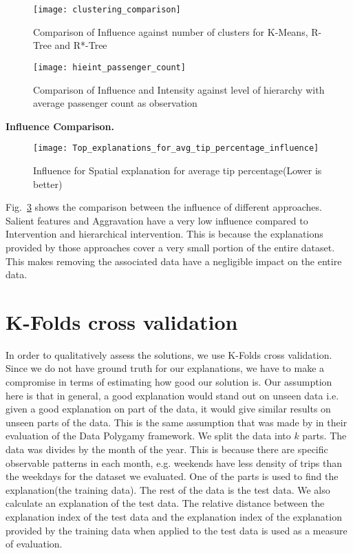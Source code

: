 \begin{figure}[H]
\texttt{[image: clustering\_comparison]}
\caption{Comparison of Influence against number of clusters for K-Means, R-Tree and R*-Tree}
\label{fig:clustering_comparison}
\end{figure}

\begin{figure}[h]
\texttt{[image: hieint\_passenger\_count]}
\caption{Comparison of Influence and Intensity against level of hierarchy with average passenger count as observation}
\label{fig:hieint_passenger_count}
\end{figure}
\textbf{Influence Comparison.}
\begin{figure}[h]
\texttt{[image: Top\_explanations\_for\_avg\_tip\_percentage\_influence]}
\caption{Influence for Spatial explanation for average tip percentage(Lower is better)}
\label{fig:influence_comparison}
\end{figure}

Fig.~\ref{fig:influence_comparison} shows the comparison between the influence of different approaches. Salient features and Aggravation have a very low influence compared to Intervention and hierarchical intervention. This is because the explanations provided by those approaches cover a very small portion of the entire dataset. This makes removing the associated data have a negligible impact on the entire data.

\section{K-Folds cross validation}
In order to qualitatively assess the solutions, we use K-Folds cross validation\citep{refaeilzadeh2009cross}. Since we do not have ground truth for our explanations, we have to make a compromise in terms of estimating how good our solution is. Our assumption here is that in general, a good explanation would stand out on unseen data i.e. given a good explanation on part of the data, it would give similar results on unseen parts of the data. This is the same assumption that was made by \cite{chirigati2016data} in their evaluation of the Data Polygamy framework. We split the data into $k$ parts. The data was divides by the month of the year. This is because there are specific observable patterns in each month, e.g. weekends have less density of trips than the weekdays for the dataset we evaluated. One of the parts is used to find the explanation(the training data). The rest of the data is the test data. We also calculate an explanation of the test data. The relative distance between the explanation index of the test data and the explanation index of the explanation provided by the training data when applied to the test data is used as a measure of evaluation.

